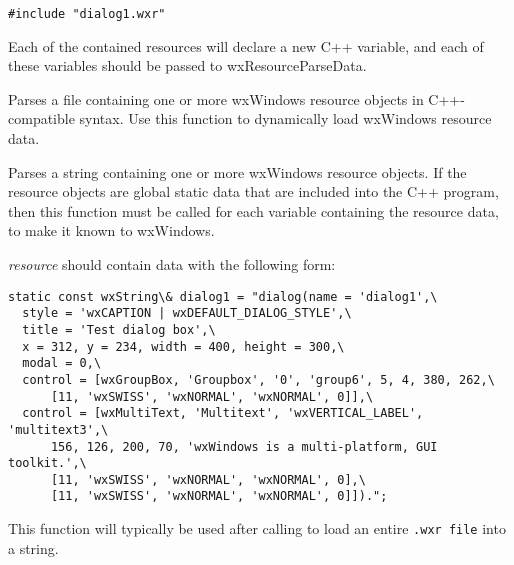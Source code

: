 \begin{verbatim}
#include "dialog1.wxr"
\end{verbatim}

Each of the contained resources will declare a new C++ variable, and each
of these variables should be passed to wxResourceParseData.



Parses a file containing one or more wxWindows resource objects
in C++-compatible syntax. Use this function to dynamically load
wxWindows resource data.

\label{wxresourceparsestring}


Parses a string containing one or more wxWindows resource objects. If
the resource objects are global static data that are included into the
C++ program, then this function must be called for each variable
containing the resource data, to make it known to wxWindows.

{\it resource} should contain data with the following form:

\begin{verbatim}
static const wxString\& dialog1 = "dialog(name = 'dialog1',\
  style = 'wxCAPTION | wxDEFAULT_DIALOG_STYLE',\
  title = 'Test dialog box',\
  x = 312, y = 234, width = 400, height = 300,\
  modal = 0,\
  control = [wxGroupBox, 'Groupbox', '0', 'group6', 5, 4, 380, 262,\
      [11, 'wxSWISS', 'wxNORMAL', 'wxNORMAL', 0]],\
  control = [wxMultiText, 'Multitext', 'wxVERTICAL_LABEL', 'multitext3',\
      156, 126, 200, 70, 'wxWindows is a multi-platform, GUI toolkit.',\
      [11, 'wxSWISS', 'wxNORMAL', 'wxNORMAL', 0],\
      [11, 'wxSWISS', 'wxNORMAL', 'wxNORMAL', 0]]).";
\end{verbatim}

This function will typically be used after calling  to
load an entire {\tt .wxr file} into a string.

\membersection{::wxResourceRegisterBitmapData}\label{registerbitmapdata}


